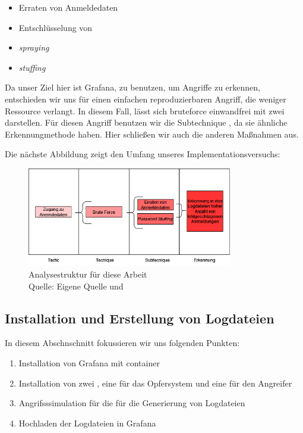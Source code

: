 \begin{itemize}[noitemsep]
   \item Erraten von Anmeldedaten 
   \item	Entschlüsselung von 
   \item \textit{\gls{spraying}}
   \item \textit{\gls{stuffing}}
\end{itemize}

Da unser Ziel hier ist Grafana, zu benutzen, um Angriffe zu erkennen, entschieden wir uns für einen einfachen reproduzierbaren Angriff, die weniger Ressource verlangt. In diesem Fall, lässt sich \gls{bruteforce} einwandfrei mit zwei  darstellen. Für diesen Angriff benutzen wir die Subtechnique , da sie ähnliche Erkennungmethode haben. Hier schließen wir auch die anderen Maßnahmen aus.

Die nächste Abbildung zeigt den Umfang unseres Implementationsversuchs:

\begin{figure}[H]
   \centering
   \includegraphics[width=0.8\textwidth]{assets/T1110.drawio.png}
   \caption{Analysestruktur für diese Arbeit  \\Quelle: Eigene Quelle und \citep{Mitre_t1110}}
   \centering
\end{figure}

\subsection{Installation und Erstellung von Logdateien}

In diesem Abschnschnitt fokussieren wir uns folgenden Punkten:

\begin{enumerate}[noitemsep]
   \item Installation von Grafana mit \gls{container}
   \item	Installation von zwei , eine für das Opfersystem und eine für den Angreifer
   \item	Angrifsssimulation für die für die Generierung von Logdateien
   \item Hochladen der Logdateien in Grafana
\end{enumerate}

